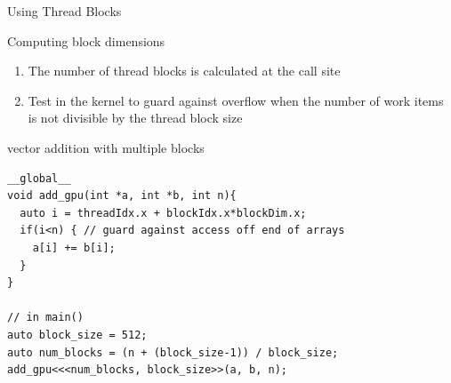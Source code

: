 \begin{frame}[fragile]{Using Thread Blocks}
    \begin{info}{Computing block dimensions}
        \begin{enumerate}
            \item The number of thread blocks is calculated at the call site
            \item Test in the kernel to guard against overflow when the number of work items is not divisible by the thread block size
        \end{enumerate}
    \end{info}

    \begin{code}{vector addition with multiple blocks}
        \begin{lstlisting}[style=boxcudatiny]
__global__
void add_gpu(int *a, int *b, int n){
  auto i = threadIdx.x + blockIdx.x*blockDim.x;
  if(i<n) { // guard against access off end of arrays
    a[i] += b[i];
  }
}

// in main()
auto block_size = 512;
auto num_blocks = (n + (block_size-1)) / block_size;
add_gpu<<<num_blocks, block_size>>(a, b, n);
        \end{lstlisting}
    \end{code}
\end{frame}

